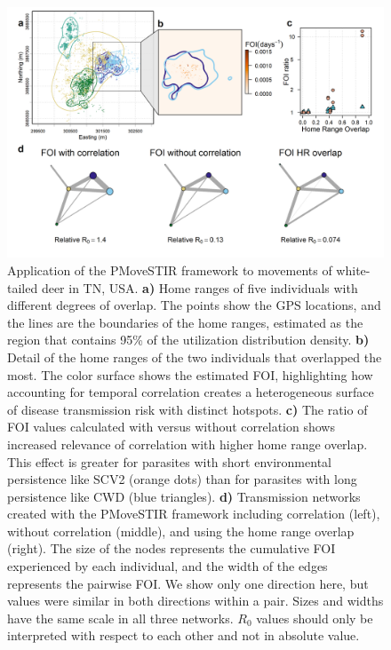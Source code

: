 \documentclass[letterpaper]{article}
\begin{document}
\begin{figure}
     \includegraphics[width=\textwidth]{figures/deer_results.png}
    \caption{Application of the PMoveSTIR framework to movements of white-tailed deer in TN, USA. \textbf{a)} Home ranges of five individuals with different degrees of overlap. The points show the GPS locations, and the lines are the boundaries of the home ranges, estimated as the region that contains 95\% of the utilization distribution density. \textbf{b)} Detail of the home ranges of the two individuals that overlapped the most. The color surface shows the estimated FOI, highlighting how accounting for temporal correlation creates a heterogeneous surface of disease transmission risk with distinct hotspots. \textbf{c)} The ratio of FOI values calculated with versus without correlation shows increased relevance of correlation with higher home range overlap. This effect is greater for parasites with short environmental persistence like SCV2 (orange dots) than for parasites with long persistence like CWD (blue triangles). \textbf{d)} Transmission networks created with the PMoveSTIR framework including correlation (left), without correlation (middle), and using the home range overlap (right). The size of the nodes represents the cumulative FOI experienced by each individual, and the width of the edges represents the pairwise FOI. We show only one direction here, but values were similar in both directions within a pair. Sizes and widths have the same scale in all three networks. $R_0$ values should only be interpreted with respect to each other and not in absolute value.}
	\label{fig:empiricalres}
\end{figure}

\clearpage



\end{document}
